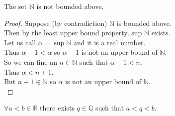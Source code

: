 \documentclass[answers,12pt,addpoints]{exam}
\begin{document}
\begin{theorem}
    The set $\mathbb{N}$ is not bounded above.\\
    \begin{proof}
        Suppose (by contradiction) $\mathbb{N}$ is bounded above. \\
        Then by the least upper bound property, sup $\mathbb{N}$ exists. \\
        Let us call $\alpha = \sup\mathbb{N}$ and it is a real number. \\
        Thus $\alpha - 1 < \alpha$ so $\alpha - 1$ is not an upper bound of $\mathbb{N}$. \\
        So we can fine an $n \in \mathbb{N}$ such that $ \alpha - 1 < n$. \\
        Thus $\alpha < n + 1$. \\
        But $n + 1 \in \mathbb{N}$ so $\alpha$ is not an upper bound of $\mathbb{N}$. \\
    \end{proof}
\end{theorem}
\begin{theorem}
    $\forall a < b \in \mathbb{R}$ there exists $q \in \mathbb{Q}$ such that $a < q < b$.
\end{theorem}
\end{document}
